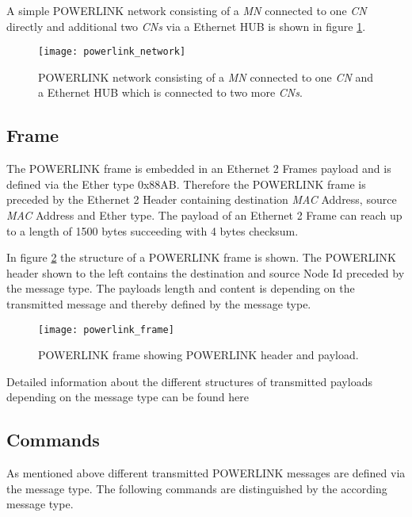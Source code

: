 A simple POWERLINK network consisting of a \emph{MN} connected to one \emph{CN} directly and additional two \emph{CNs} via a Ethernet HUB is shown in figure \ref{fig:powerlink_network}.

\begin{figure}
    \centering
    \texttt{[image: powerlink\_network]}
    \caption{POWERLINK network consisting of a \emph{MN} connected to one \emph{CN} and a Ethernet HUB which is connected to two more \emph{CNs}.}
    \label{fig:powerlink_network}
\end{figure}



\subsection{Frame}
\label{sec:oplk_powerlink_frame}
The POWERLINK frame is embedded in an Ethernet 2 Frames payload and is defined via the Ether type 0x88AB.
Therefore the POWERLINK frame is preceded by the Ethernet 2 Header containing destination \emph{MAC} Address, source \emph{MAC} Address and Ether type.
The payload of an Ethernet 2 Frame can reach up to a length of 1500 bytes succeeding with 4 bytes checksum. \cite[section 3.2]{ethernet_ieee_2016} \cite[section 4.6.1]{epsg_epsg_2013}

In figure \ref{fig:powerlink_frame} the structure of a POWERLINK frame is shown.
The POWERLINK header shown to the left contains the destination and source Node Id preceded by the message type.
The payloads length and content is depending on the transmitted message and thereby defined by the message type. \cite[section 4.6.1.1]{epsg_epsg_2013}

\begin{figure}
    \centering
    \texttt{[image: powerlink\_frame]}
    \caption{POWERLINK frame showing POWERLINK header and payload.}
    \label{fig:powerlink_frame}
\end{figure}

Detailed information about the different structures of transmitted payloads depending on the message type can be found here \cite[section 4.6.1.1.1]{epsg_epsg_2013}

\subsection{Commands}
\label{sec:oplk_powerlink_commands}

As mentioned above different transmitted POWERLINK messages are defined via the message type.
The following commands are distinguished by the according message type.

